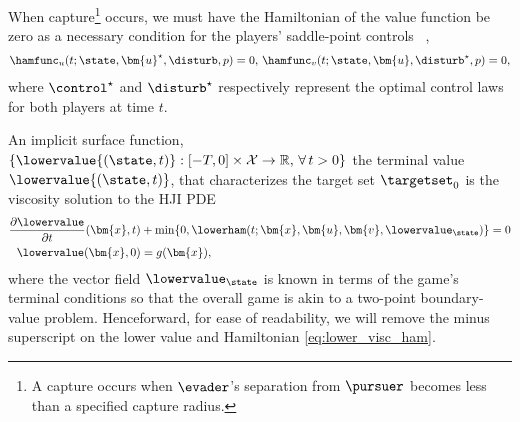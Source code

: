 %
When capture\footnote{A capture occurs when $\evader$'s separation from $\pursuer$ becomes less than a specified \eg capture radius.} occurs, we must have the Hamiltonian of the value function be zero as a necessary condition for the players' saddle-point controls~\cite{Merz1972,Isaacs1965} \ie,
%
\begin{align}
	\hamfunc_u(t; \state, \bm{u}^\star, \disturb, p) =0, \,\hamfunc_v(t; \state, \bm{u}, \disturb^\star, p) =0,
\end{align} 
where $\control^\star$ and $\disturb^\star$ respectively represent the optimal control laws for both players at time $t$.

 An implicit surface function, $\{\lowervalue{(\state, t)}: \left[-T, 0\right] \times \mathcal{X}\rightarrow\mathbb{R}, \, \forall \, t>0\}$ \ie the terminal value $\lowervalue {(\state, t)}$, that characterizes the target set $\targetset_0$ is the viscosity solution to the HJI PDE
%
\begin{subequations}
	\begin{align}
		\frac{\partial \lowervalue}{\partial t}{(\bm{x}, t)} & + \min \{0, \lowerham (t; \bm{x}, \bm{u}, \bm{v},\lowervalue_{\state}) \} = 0 \\
		\lowervalue(\bm{x},0) &= g(\bm{x}),
	\end{align}
	\label{eq:lower_hji_pde}
\end{subequations}
%
\noindent where the vector field $\lowervalue_{\state}$ is known in terms of the game's terminal conditions so that the overall game is akin to a two-point boundary-value problem. Henceforward, for ease of readability, we will remove the minus superscript on the lower value and Hamiltonian \eqref{eq:lower_visc_ham}. 
